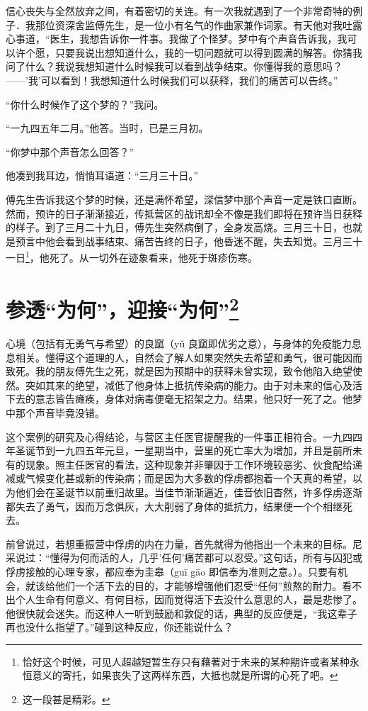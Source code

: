 \documentclass[11pt,oneside]{book}
\begin{document}
\begin{common-format}
信心丧失与全然放弃之间，有着密切的关连。有一次我就遇到了一个非常奇特的例子．我那位资深舍监傅先生，是一位小有名气的作曲家兼作词家。有天他对我吐露心事道，“医生，我想告诉你一件事。我做了个怪梦。梦中有个声音告诉我，我可以许个愿，只要我说出想知道什么，我的一切问题就可以得到圆满的解答。你猜我问了什么？我说我想知道什么时候我可以看到战争结束。你懂得我的意思吗？——'我'可以看到！我想知道什么时候我们可以获释，我们的痛苦可以告终。”

“你什么时候作了这个梦的？”我问。

“一九四五年二月。”他答。当时，已是三月初。

“你梦中那个声音怎么回答？”

他凑到我耳边，悄悄耳语道：“三月三十日。”

傅先生告诉我这个梦的时候，还是满怀希望，深信梦中那个声音一定是铁口直断。然而，预许的日子渐渐接近，传抵营区的战讯却全不像是我们即将在预许当日获释的样子。到了三月二十九日，傅先生突然病倒了，全身发高烧。三月三十日，也就是预言中他会看到战事结束、痛苦告终的日子，他昏迷不醒，失去知觉。三月三十一日\footnote{恰好这个时候，可见人超越短暂生存只有藉著对于未来的某种期许或者某种永恒意义的寄托，如果丧失了这两样东西，大抵也就是所谓的心死了吧。}，他死了。从一切外在迹象看来，他死于斑疹伤寒。


\section[参透“为何”，迎接“为何”]{参透“为何”，迎接“为何”\footnote{这一段甚是精彩。}}
心境（包括有无勇气与希望）的良窳（yǔ 良窳即优劣之意），与身体的免疫能力息息相关。懂得这个道理的人，自然会了解人如果突然失去希望和勇气，很可能因而致死。我的朋友傅先生之死，就是因为预期中的获释未曾实现，致令他陷入绝望使然。突如其来的绝望，减低了他身体上抵抗传染病的能力。由于对未来的信心及活下去的意志皆告瘫痪，身体对病毒便毫无招架之力。结果，他只好一死了之。他梦中那个声音毕竟没错。

这个案例的研究及心得结论，与营区主任医官提醒我的一件事正相符合。一九四四年圣诞节到一九四五年元旦，一星期当中，营里的死亡率大为增加，并且是前所未有的现象。照主任医官的看法，这种现象并非肇因于工作环境较恶劣、伙食配给递减或气候变化甚或新的传染病；而是因为大多数的俘虏都抱着一个天真的希望，以为他们会在圣诞节以前重归故里。当佳节渐渐逼近，佳音依旧杳然，许多俘虏逐渐都失去了勇气，因而万念俱灰，大大削弱了身体的抵抗力，结果便一个个相继死去。

前曾说过，若想重振营中俘虏的内在力量，首先就得为他指出一个未来的目标。尼采说过：“懂得为何而活的人，几乎'任何'痛苦都可以忍受。”这句话，所有与囚犯或俘虏接触的心理专家，都应奉为圭皋（guī gāo 即信奉为准则之意。）。只要有机会，就该给他们一个活下去的目的，才能够增强他们忍受“任何”煎熬的耐力。看不出个人生命有何意义、有何目标，因而觉得活下去没什么意思的人，最是悲惨了。他很快就会迷失。而这种人一听到鼓励和敦促的话，典型的反应便是，“我这辈子再也没什么指望了。”碰到这种反应，你还能说什么？


\end{common-format}
\end{document}
